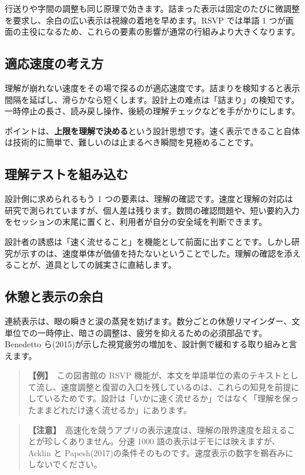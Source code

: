 \documentclass{article}
\begin{document}
行送りや字間の調整も同じ原理で効きます。詰まった表示は固定のたびに微調整を要求し、余白の広い表示は視線の着地を早めます。RSVP では単語 1 つが画面の主役になるため、これらの要素の影響が通常の行組みより大きくなります。

\subsection{適応速度の考え方}

理解が崩れない速度をその場で探るのが適応速度です。詰まりを検知すると表示間隔を延ばし、滑らかなら短くします。設計上の难点は「詰まり」の検知です。一時停止の長さ、読み戻し操作、後続の理解チェックなどを手がかりにします。

ポイントは、\textbf{上限を理解で決める}という設計思想です。速く表示できること自体は技術的に簡単で、難しいのは止まるべき瞬間を見極めることです。

\subsection{理解テストを組み込む}

設計側に求められるもう 1 つの要素は、理解の確認です。速度と理解の対応は研究で測られていますが、個人差は残ります。数問の確認問題や、短い要約入力をセッションの末尾に置くと、利用者が自分の安全域を判断できます。

設計者の誘惑は「速く流せること」を機能として前面に出すことです。しかし研究が示すのは、速度単体が価値を持たないということでした。理解の確認を添えることが、道具としての誠実さに直結します。

\subsection{休憩と表示の余白}

連続表示は、眼の瞬きと涙の蒸発を妨げます。数分ごとの休憩リマインダー、文単位での一時停止、暗さの調整は、疲労を抑えるための必須部品です。Benedetto ら(2015)が示した視覚疲労の増加を、設計側で緩和する取り組みと言えます。

\begin{quote}
\textbf{【例】}\ この図書館の RSVP 機能が、本文を単語単位の素のテキストとして流し、速度調整と復習の入口を残しているのは、これらの知見を前提にしているためです。設計は「いかに速く流せるか」ではなく「理解を保ったままどれだけ速く流せるか」にあります。
\end{quote}

\begin{quote}
\textbf{【注意】}\ 高速化を競うアプリの表示速度は、理解の限界速度を超えることが珍しくありません。分速 1000 語の表示はデモには映えますが、Acklin と Papesh(2017)の条件そのものです。速度表示の数字を鵜呑みにしないでください。
\end{quote}
\end{document}
